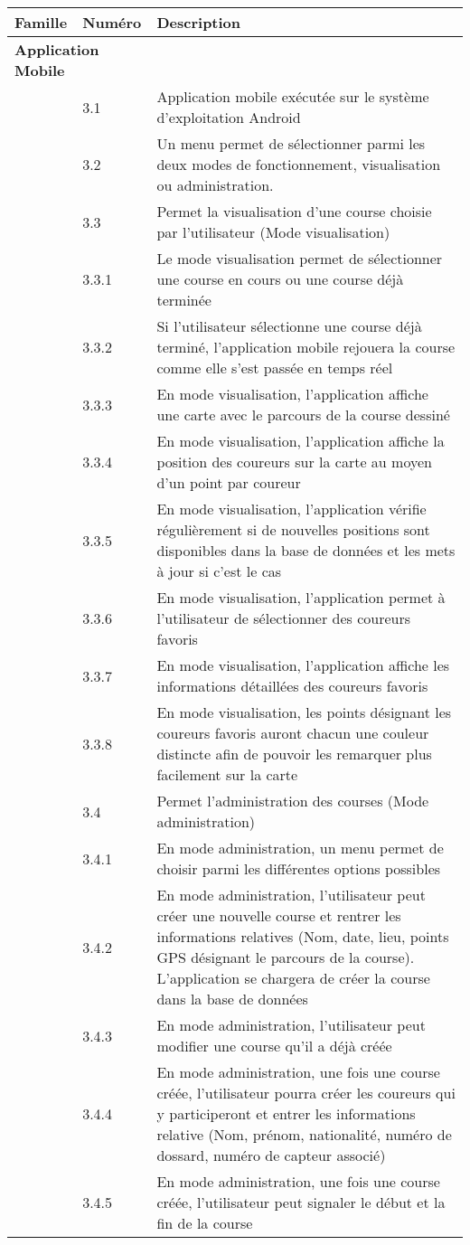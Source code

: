 \begin{tabular}{llp{10cm}}
\toprule
Famille & Numéro & Description \\
\midrule
\multicolumn{2}{l}{\textbf{Application Mobile}} \\
 & 3.1 & Application mobile exécutée sur le système d’exploitation Android \\
 & 3.2 & Un menu permet de sélectionner parmi les deux modes de fonctionnement, visualisation ou administration. \\
 & 3.3 & Permet la visualisation d’une course choisie par l’utilisateur (Mode visualisation) \\
 & 3.3.1 & Le mode visualisation permet de sélectionner une course en cours ou une course déjà terminée \\
 & 3.3.2 & Si l’utilisateur sélectionne une course déjà terminé, l’application mobile rejouera la course comme elle s’est passée en temps réel \\
 & 3.3.3 & En mode visualisation, l’application affiche une carte avec le parcours de la course dessiné \\
 & 3.3.4 & En mode visualisation, l’application affiche la position des coureurs sur la carte au moyen d’un point par coureur \\
 & 3.3.5 & En mode visualisation, l’application vérifie régulièrement si de nouvelles positions sont disponibles dans la base de données et les mets à jour si c’est le cas \\
 & 3.3.6 & En mode visualisation, l’application permet à l’utilisateur de sélectionner des coureurs favoris \\
 & 3.3.7 & En mode visualisation, l’application affiche les informations détaillées des coureurs favoris \\
 & 3.3.8 & En mode visualisation, les points désignant les coureurs favoris auront chacun une couleur distincte afin de pouvoir les remarquer plus facilement sur la carte \\
 & 3.4 & Permet l’administration des courses (Mode administration) \\
 & 3.4.1 & En mode administration, un menu permet de choisir parmi les différentes options possibles \\
 & 3.4.2 & En mode administration, l’utilisateur peut créer une nouvelle course et rentrer les informations relatives (Nom, date, lieu, points GPS désignant le parcours de la course). L’application se chargera de créer la course dans la base de données \\
 & 3.4.3 & En mode administration, l’utilisateur peut modifier une course qu’il a déjà créée \\ 
 & 3.4.4 & En mode administration, une fois une course créée, l’utilisateur pourra créer les coureurs qui y participeront et entrer les informations relative (Nom, prénom, nationalité, numéro de dossard, numéro de capteur associé) \\
 & 3.4.5 & En mode administration, une fois une course créée, l’utilisateur peut signaler le début et la fin de la course \\
\bottomrule
\end{tabular}